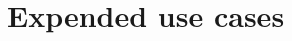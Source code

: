 \documentclass[12pt,a4paper]{article}
\begin{document}
\newpage
\section{Expended use cases}
\end{document}
